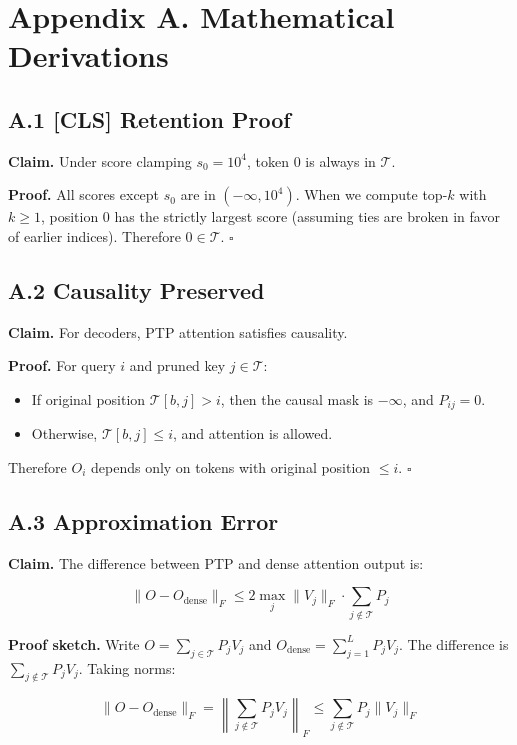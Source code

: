 
\section{Appendix A. Mathematical Derivations}

\subsection{A.1 [CLS] Retention Proof}

\textbf{Claim.} Under score clamping $s_0 = 10^4$, token 0 is always in 
$\mathcal{T}$.

\textbf{Proof.} All scores except $s_0$ are in $(-\infty, 10^4)$. When we 
compute top-$k$ with $k \geq 1$, position 0 has the strictly largest 
score (assuming ties are broken in favor of earlier indices). Therefore 
$0 \in \mathcal{T}$. $\square$

\subsection{A.2 Causality Preserved}

\textbf{Claim.} For decoders, PTP attention satisfies causality.

\textbf{Proof.} For query $i$ and pruned key $j \in \mathcal{T}$:
\begin{itemize}
\item If original position $\mathcal{T}[b, j] > i$, then the causal mask is
  $-\infty$, and $P_{ij} = 0$.
\item Otherwise, $\mathcal{T}[b, j] \leq i$, and attention is allowed.

\end{itemize}
Therefore $O_i$ depends only on tokens with original position $\leq i$. 
$\square$

\subsection{A.3 Approximation Error}

\textbf{Claim.} The difference between PTP and dense attention output is:

\[
\|O - O_\text{dense}\|_F \leq 2 \max_j \|V_j\|_F \cdot \sum_{j \notin \mathcal{T}} P_j
\tag{A.1}
\]

\textbf{Proof sketch.} Write $O = \sum_{j \in \mathcal{T}} P_j V_j$ and 
$O_\text{dense} = \sum_{j=1}^L P_j V_j$. The difference is 
$\sum_{j \notin \mathcal{T}} P_j V_j$. Taking norms:

\[
\|O - O_\text{dense}\|_F = \left\|\sum_{j \notin \mathcal{T}} P_j V_j\right\|_F \leq \sum_{j \notin \mathcal{T}} P_j \|V_j\|_F
\]

